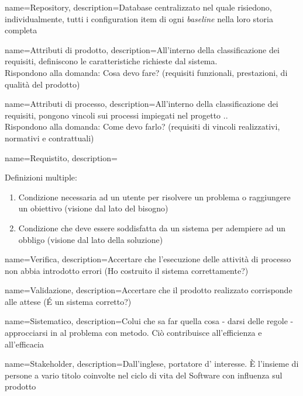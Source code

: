 {
  name=Repository,
  description={Database centralizzato nel quale risiedono, individualmente, tutti i configuration item di ogni \textit{baseline} nella loro storia completa}
}

{
  name=Attributi di prodotto,
  description={All'interno della classificazione dei requisiti, definiscono le caratteristiche richieste dal sistema.\\ Rispondono alla domanda: Cosa devo fare? (requisiti funzionali, prestazioni, di qualità del prodotto)}
}

{
  name=Attributi di processo,
  description={All'interno della classificazione dei requisiti, pongono vincoli sui processi impiegati nel progetto 
  ..\\ Rispondono alla domanda: Come devo farlo? (requisiti di vincoli realizzativi, normativi e contrattuali)}
}

{
  name=Requistito,
  description={Definizioni multiple:
  \begin{enumerate}
  \item Condizione necessaria ad un utente per risolvere un problema o raggiungere un obiettivo (visione dal lato del bisogno)
  \item Condizione che deve essere soddisfatta da un sistema per adempiere ad un obbligo (visione dal lato della soluzione)
  \end{enumerate}}
}

{
  name=Verifica,
  description={Accertare che l'esecuzione delle attività di processo non abbia introdotto errori (Ho costruito il sistema correttamente?)}
}

{
  name=Validazione,
  description={Accertare che il prodotto realizzato corrisponde alle attese (\' E un sistema corretto?)}
}


{
name=Sistematico,
description={Colui che sa far quella cosa - darsi delle regole - approcciarsi in al problema con metodo. Ciò contribuisce all'efficienza e all'efficacia}
}

{
name=Stakeholder,
description={Dall'inglese, portatore d' interesse. È l'insieme di persone a vario titolo coinvolte nel ciclo di vita del Software con influenza sul prodotto}
}


